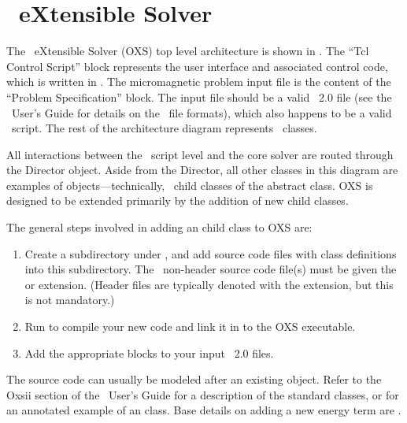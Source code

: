 \chapter{\OOMMF\ eXtensible Solver}\label{sec:oxs}
The \OOMMF\ eXtensible Solver (OXS) top level architecture is shown in
.
The ``Tcl Control Script'' block represents the user interface and
associated control code, which is written in \Tcl.  The
micromagnetic problem input file is the content of the ``Problem
Specification'' block.  The input file should be a valid \MIF~2.0 file
(see the \OOMMF\ User's Guide for details on the \MIF\ file formats),
which also happens to be a valid \Tcl\ script.  The rest of the
architecture diagram represents \Cplusplus\ classes.


All interactions between the \Tcl\ script level and the core solver are
routed through the Director object.  Aside from the Director, all other
classes in this diagram are examples of 
objects---technically, \Cplusplus\ child classes of the abstract
 class.  OXS is designed to be extended primarily by the
addition of new  child classes.

The general steps involved in adding an  child class to OXS
are:
\begin{enumerate}

\item Create a subdirectory under , and add
source code files with class definitions into this subdirectory. The
\Cplusplus\ non-header source code file(s) must be given the  or
 extension.  (Header files are typically denoted with the
 extension, but this is not mandatory.)
\item Run  to compile your new code and link it in to the OXS
executable.
\item Add the appropriate  blocks to your input \MIF~2.0
files.
\end{enumerate}
The source code can usually be modeled after an existing 
object.  Refer to the Oxsii section of the \OOMMF\ User's Guide for a
description of the standard  classes, or
 for an annotated example of
an  class.  Base details on adding a new energy term are
.

